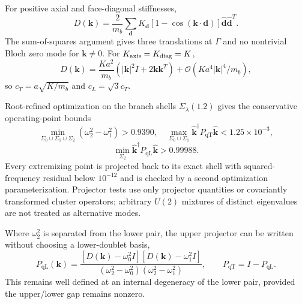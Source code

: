 \documentclass[10pt,aps,pre,onecolumn,notitlepage,nofootinbib]{revtex4-2}
\newcommand{\vk}{\bm k}
\newcommand{\qT}{\mathrm{qT}}
\newcommand{\qL}{\mathrm{qL}}
\newcommand{\order}{\mathcal O}
\begin{document}
For positive axial and face-diagonal stiffnesses,
\begin{equation}
 D(\vk)=\frac{2}{m_b}\sum_{\bm d}K_{\bm d}[1-\cos(\vk\cdot\bm d)]\hat{\bm d}\hat{\bm d}^{T}.
\end{equation}
The sum-of-squares argument gives three translations at $\Gamma$ and no nontrivial Bloch zero mode for $\vk\ne0$.  For $K_{\rm axis}=K_{\rm diag}=K$,
\begin{equation}
 D(\vk)=\frac{Ka^2}{m_b}(|\vk|^2I+2\vk\vk^T)+\order(Ka^4|\vk|^4/m_b),
\end{equation}
so $c_T=a\sqrt{K/m_b}$ and $c_L=\sqrt3c_T$.

Root-refined optimization on the branch shells $\Sigma_\lambda(1.2)$ gives the conservative operating-point bounds
\begin{equation}
 \min_{\Sigma_0\cup\Sigma_1\cup\Sigma_2}(\omega_2^2-\omega_1^2)>0.9390,
 \quad
 \max_{\Sigma_0\cup\Sigma_1}\hat{\vk}^{\dagger}P_{\qT}\hat{\vk}<1.25\times10^{-3},
\end{equation}
\begin{equation}
 \min_{\Sigma_2}\hat{\vk}^{\dagger}P_{\qL}\hat{\vk}>0.99988.
\end{equation}
Every extremizing point is projected back to its exact shell with squared-frequency residual below $10^{-12}$ and is checked by a second optimization parameterization. Projector tests use only projector quantities or covariantly transformed cluster operators; arbitrary $U(2)$ mixtures of distinct eigenvalues are not treated as alternative modes.

Where $\omega_2^2$ is separated from the lower pair, the upper projector can be written without choosing a lower-doublet basis,
\begin{equation}
 P_{\qL}(\vk)=
 \frac{[D(\vk)-\omega_0^2I][D(\vk)-\omega_1^2I]}
 {(\omega_2^2-\omega_0^2)(\omega_2^2-\omega_1^2)},
 \qquad P_{\qT}=I-P_{\qL}.
\end{equation}
This remains well defined at an internal degeneracy of the lower pair, provided the upper/lower gap remains nonzero.
\end{document}
